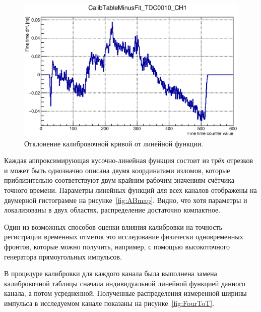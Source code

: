 \begin{figure}
\includegraphics[width=1.0\textwidth]{pictures/CalTableMinusFit_0010_01.eps}
\caption{Отклонение калибровочной кривой от линейной функции.}
\label{fig:CalibTableMinusFit}
\end{figure}

Каждая аппроксимирующая кусочно-линейная функция состоит из трёх отрезков и может быть однозначно описана двумя координатами изломов, которые приблизительно соответствуют двум крайним рабочим значениям счётчика точного времени. Параметры линейных функций для всех каналов отображены на двумерной гистограмме на рисунке~\ref{fig:ABmap}. Видно, что хотя параметры и локализованы в двух областях, распределение достаточно компактное.

Один из возможных способов оценки влияния калибровки на точность регистрации временных отметок это исследование физически одновременных фронтов, которые можно получить, например, с помощью высокоточного генератора прямоугольных импульсов.


В процедуре калибровки для каждого канала была выполнена замена калибровочной таблицы сначала индивидуальной линейной функцией данного канала, а потом усредненной. Полученные распределения измеренной ширины импульса в исследуемом канале показаны на рисунке~\ref{fig:FourToT}.

